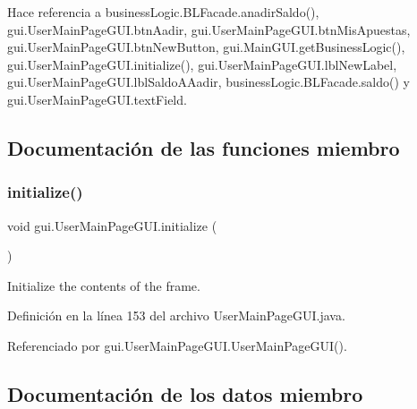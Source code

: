 Hace referencia a business\+Logic.\+B\+L\+Facade.\+anadir\+Saldo(), gui.\+User\+Main\+Page\+G\+U\+I.\+btn\+Aadir, gui.\+User\+Main\+Page\+G\+U\+I.\+btn\+Mis\+Apuestas, gui.\+User\+Main\+Page\+G\+U\+I.\+btn\+New\+Button, gui.\+Main\+G\+U\+I.\+get\+Business\+Logic(), gui.\+User\+Main\+Page\+G\+U\+I.\+initialize(), gui.\+User\+Main\+Page\+G\+U\+I.\+lbl\+New\+Label, gui.\+User\+Main\+Page\+G\+U\+I.\+lbl\+Saldo\+A\+Aadir, business\+Logic.\+B\+L\+Facade.\+saldo() y gui.\+User\+Main\+Page\+G\+U\+I.\+text\+Field.



\subsection{Documentación de las funciones miembro}
\mbox{\label{classgui_1_1UserMainPageGUI_a791979d127c9afba1a1a97cd1de7afc0}} 
\subsubsection{\texorpdfstring{initialize()}{initialize()}}
{\footnotesize\ttfamily void gui.\+User\+Main\+Page\+G\+U\+I.\+initialize (\begin{DoxyParamCaption}{ }\end{DoxyParamCaption})\hspace{0.3cm}{\ttfamily [private]}}

Initialize the contents of the frame. 

Definición en la línea 153 del archivo User\+Main\+Page\+G\+U\+I.\+java.


\begin{DoxyCode}{0}

\end{DoxyCode}


Referenciado por gui.\+User\+Main\+Page\+G\+U\+I.\+User\+Main\+Page\+G\+U\+I().



\subsection{Documentación de los datos miembro}
\mbox{\label{classgui_1_1UserMainPageGUI_a2672451d61382e7df4ddfb581b4c8ccf}} 
